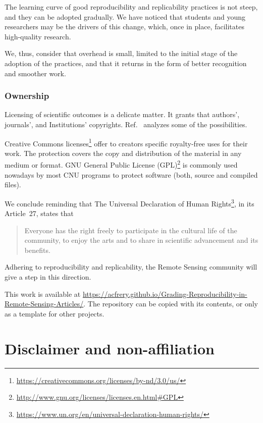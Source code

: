 \documentclass[journal,twoside]{IEEEtran}
\begin{document}
The learning curve of good reproducibility and replicability practices is not steep, and they can be adopted gradually.
We have noticed that students and young researchers may be the drivers of this change, which, once in place, facilitates high-quality research.

We, thus, consider that overhead is small, limited to the initial stage of the adoption of the practices, and that it returns in the form of better recognition and smoother work.

\subsubsection{Ownership}\label{Sec:Ownership}

Licensing of scientific outcomes is a delicate matter.
It grants that authors', journals', and Institutions' copyrights.
Ref.~\cite{TheLegalFrameworkforReproducibleScientificResearchLicensingandCopyright} analyzes some of the possibilities.  

Creative Commons licenses\footnote{\url{https://creativecommons.org/licenses/by-nd/3.0/us/}} offer to creators specific royalty-free uses for their work. 
The protection covers the copy and distribution of the material in any medium or format. 
GNU General Public License (GPL)\footnote{\url{http://www.gnu.org/licenses/licenses.en.html#GPL}} is commonly used nowadays by most CNU programs to protect software (both, source and compiled files). 

We conclude reminding that The Universal Declaration of Human Rights\footnote{\url{https://www.un.org/en/universal-declaration-human-rights/}}, in its Article~27, states that
\begin{quote}
	Everyone has the right freely to participate in the cultural life of the community, to enjoy the arts and to share in scientific advancement and its benefits.
\end{quote}
Adhering to reproducibility and replicability, the Remote Sensing community will give a step in this direction.

This work is available at \url{https://acfrery.github.io/Grading-Reproducibility-in-Remote-Sensing-Articles/}.
The repository can be copied with its contents, or only as a template for other projects.

\section*{Disclaimer and non-affiliation}
\end{document}
